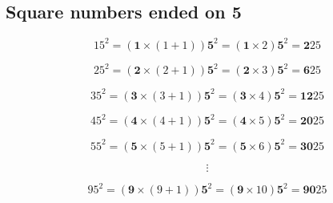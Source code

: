 \documentclass[12pt, a5paper]{article}
\begin{document}
\subsection*{Square numbers ended on 5}

$$
15^2 = (\mathbf{1} \times (1 + 1)) \mathbf{5}^2 = (\mathbf{1} \times 2) \mathbf{5}^2 = \mathbf{2}25
$$

$$
25^2 = (\mathbf{2} \times (2 + 1)) \mathbf{5}^2 = (\mathbf{2} \times 3) \mathbf{5}^2 = \mathbf{6}25
$$

$$
35^2 = (\mathbf{3} \times (3 + 1)) \mathbf{5}^2 = (\mathbf{3} \times 4) \mathbf{5}^2 = \mathbf{12}25
$$

$$
45^2 = (\mathbf{4} \times (4 + 1)) \mathbf{5}^2 = (\mathbf{4} \times 5) \mathbf{5}^2 = \mathbf{20}25
$$

$$
55^2 = (\mathbf{5} \times (5 + 1)) \mathbf{5}^2 = (\mathbf{5} \times 6) \mathbf{5}^2 = \mathbf{30}25
$$

$$
\vdots
$$

$$
95^2 = (\mathbf{9} \times (9 + 1)) \mathbf{5}^2 = (\mathbf{9} \times 10) \mathbf{5}^2 = \mathbf{90}25
$$
\end{document}
